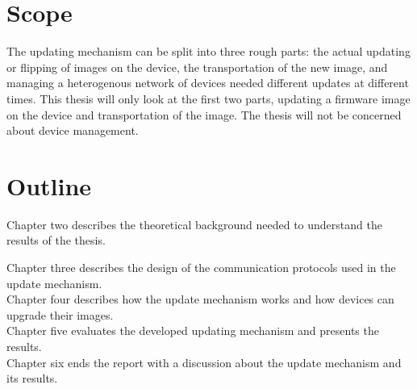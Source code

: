 \documentclass[0-thesis.tex]{subfiles}
\begin{document}
\section{Scope}
The updating mechanism can be split into three rough parts: the actual updating or flipping of 
images on the device, the transportation of the new image, and managing a heterogenous network
of devices needed different updates at different times. This thesis will only look at the first 
two parts, updating a firmware image on the device and transportation of the image. The thesis 
will not be concerned about device management.

\section{Outline}
Chapter two describes the theoretical background needed to understand the results of the thesis.\newline

Chapter three describes the design of the communication protocols used in the update mechanism.\\

Chapter four describes how the update mechanism works and how devices can upgrade their images.\\

Chapter five evaluates the developed updating mechanism and presents the results.\\

Chapter six ends the report with a discussion about the update mechanism and its results.\\
\end{document}
